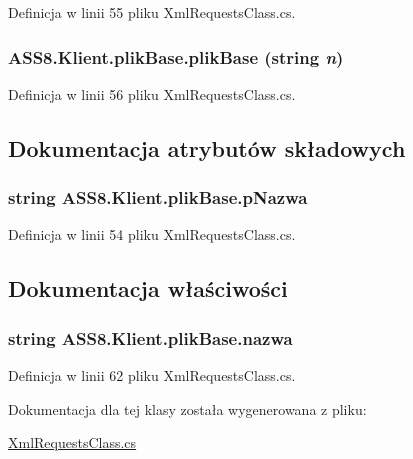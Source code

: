 Definicja w linii 55 pliku XmlRequestsClass.cs.\hypertarget{a00016_db9e4e56cb170266f06c629d133fbb35}{
\subsubsection[{plikBase}]{\setlength{\rightskip}{0pt plus 5cm}ASS8.Klient.plikBase.plikBase (string {\em n})}}
\label{d7/d7a/a00016_db9e4e56cb170266f06c629d133fbb35}




Definicja w linii 56 pliku XmlRequestsClass.cs.

\subsection{Dokumentacja atrybutów składowych}
\hypertarget{a00016_806525aec3846557cca2c83f4f28bd22}{
\subsubsection[{pNazwa}]{\setlength{\rightskip}{0pt plus 5cm}string {\bf ASS8.Klient.plikBase.pNazwa}}}
\label{d7/d7a/a00016_806525aec3846557cca2c83f4f28bd22}




Definicja w linii 54 pliku XmlRequestsClass.cs.

\subsection{Dokumentacja właściwości}
\hypertarget{a00016_d79d58573126b1cd96f3c6966ae83434}{
\subsubsection[{nazwa}]{\setlength{\rightskip}{0pt plus 5cm}string ASS8.Klient.plikBase.nazwa}}
\label{d7/d7a/a00016_d79d58573126b1cd96f3c6966ae83434}




Definicja w linii 62 pliku XmlRequestsClass.cs.

Dokumentacja dla tej klasy została wygenerowana z pliku:\begin{CompactItemize}
\item 
\hyperlink{a00055}{XmlRequestsClass.cs}\end{CompactItemize}
